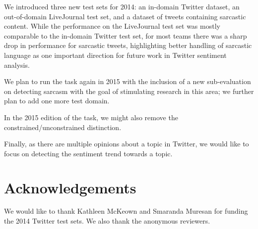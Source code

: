 \documentclass[11pt]{article}
\begin{document}

We introduced three new test sets for 2014:
an in-domain Twitter dataset,
an out-of-domain LiveJournal test set,
and a dataset of tweets containing sarcastic content.
While the performance on the LiveJournal test set was mostly comparable to the in-domain Twitter test set,
for most teams there was a sharp drop in performance for sarcastic tweets,
highlighting better handling of sarcastic language as one important direction for future work in Twitter sentiment analysis.

We plan to run the task again in 2015 with the inclusion of a new sub-evaluation on detecting sarcasm
with the goal of stimulating research in this area; we further plan to add one more test domain.

In the 2015 edition of the task, we might also remove the constrained/unconstrained distinction.

Finally, as there are multiple opinions about a topic in Twitter,
we would like to focus on detecting the sentiment trend towards a topic.


\section*{Acknowledgements}

We would like to thank Kathleen McKeown and Smaranda Muresan for funding the 2014 Twitter test sets.
We also thank the anonymous reviewers.
\end{document}
